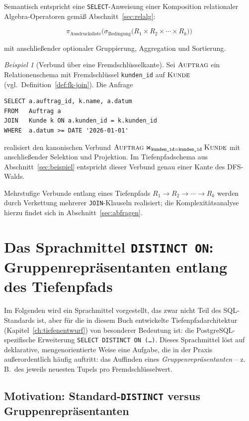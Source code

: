 ﻿\documentclass[a4paper,12pt]{report}
\theoremstyle{definition}
\theoremstyle{remark}
\newtheorem{example}{Beispiel}[chapter]
\begin{document}
Semantisch entspricht eine \texttt{SELECT}-Anweisung einer Komposition
relationaler Algebra-Operatoren gemäß Abschnitt~\ref{sec:relalg}:

\[
\pi_{\text{Ausdrucksliste}}\Big(
  \sigma_{\text{Bedingung}}\big(
    R_1 \times R_2 \times \cdots \times R_k
  \big)
\Big)
\]

mit anschließender optionaler Gruppierung, Aggregation und Sortierung.

\begin{example}[Verbund über eine Fremdschlüsselkante]
\label{ex:join-tiefe}
Sei $\textsc{Auftrag}$ ein Relationenschema mit Fremdschlüssel
\texttt{kunden\_id} auf $\textsc{Kunde}$ (vgl.\ Definition~\ref{def:fk-join}).
Die Anfrage
\begin{lstlisting}
SELECT a.auftrag_id, k.name, a.datum
FROM   Auftrag a
JOIN   Kunde k ON a.kunden_id = k.kunden_id
WHERE  a.datum >= DATE '2026-01-01'
\end{lstlisting}
realisiert den kanonischen Verbund $\textsc{Auftrag}
\Join_{\texttt{kunden\_id}=\texttt{kunden\_id}} \textsc{Kunde}$ mit
anschließender Selektion und Projektion. Im Tiefenpfadschema aus
Abschnitt~\ref{sec:beispiel} entspricht dieser Verbund genau
einer Kante des DFS-Walds.
\end{example}

Mehrstufige Verbunde entlang eines Tiefenpfads
$R_1 \rightarrow R_2 \rightarrow \cdots \rightarrow R_k$ werden durch
Verkettung mehrerer \texttt{JOIN}-Klauseln realisiert; die
Komplexitätsanalyse hierzu findet sich in
Abschnitt~\ref{sec:abfragen}.

\section{Das Sprachmittel \texttt{DISTINCT ON}: Gruppenrepräsentanten entlang des Tiefenpfads}
\label{sec:distinct-on}

Im Folgenden wird ein Sprachmittel vorgestellt, das zwar nicht Teil des
SQL-Standards ist, aber für die in diesem Buch entwickelte
Tiefenpfadarchitektur (Kapitel~\ref{ch:tiefenentwurf}) von besonderer
Bedeutung ist: die PostgreSQL-spezifische Erweiterung
\texttt{SELECT DISTINCT ON (\ldots)}. Dieses Sprachmittel löst auf
deklarative, mengenorientierte Weise eine Aufgabe, die in der Praxis
außerordentlich häufig auftritt: das Auffinden eines
\emph{Gruppenrepräsentanten} -- z.\,B.\ des jeweils neuesten Tupels pro
Fremdschlüsselwert.

\subsection{Motivation: Standard-\texttt{DISTINCT} versus Gruppenrepräsentanten}
\end{document}
